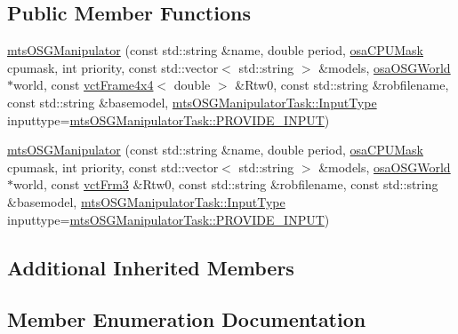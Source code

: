 \subsection*{Public Member Functions}
\begin{DoxyCompactItemize}
\item 
\hyperlink{classmts_o_s_g_manipulator_ad0e556ae33153cc2c06804894bce948a}{mts\+O\+S\+G\+Manipulator} (const std\+::string \&name, double period, \hyperlink{osa_c_p_u_affinity_8h_aaec7cdd7797e5e6eb5438c15fee5477a}{osa\+C\+P\+U\+Mask} cpumask, int priority, const std\+::vector$<$ std\+::string $>$ \&models, \hyperlink{classosa_o_s_g_world}{osa\+O\+S\+G\+World} $\ast$world, const \hyperlink{classvct_frame4x4}{vct\+Frame4x4}$<$ double $>$ \&Rtw0, const std\+::string \&robfilename, const std\+::string \&basemodel, \hyperlink{classmts_o_s_g_manipulator_task_a176aa50980ddf34d1150514bb620cb8f}{mts\+O\+S\+G\+Manipulator\+Task\+::\+Input\+Type} inputtype=\hyperlink{classmts_o_s_g_manipulator_task_a176aa50980ddf34d1150514bb620cb8fa73f760c3f4b883d0ce1a241d172e626a}{mts\+O\+S\+G\+Manipulator\+Task\+::\+P\+R\+O\+V\+I\+D\+E\+\_\+\+I\+N\+P\+U\+T})
\item 
\hyperlink{classmts_o_s_g_manipulator_a5d858b4f653797b6945b87be39da8830}{mts\+O\+S\+G\+Manipulator} (const std\+::string \&name, double period, \hyperlink{osa_c_p_u_affinity_8h_aaec7cdd7797e5e6eb5438c15fee5477a}{osa\+C\+P\+U\+Mask} cpumask, int priority, const std\+::vector$<$ std\+::string $>$ \&models, \hyperlink{classosa_o_s_g_world}{osa\+O\+S\+G\+World} $\ast$world, const \hyperlink{vct_transformation_types_8h_a81feda0a02c2d1bc26e5553f409fed20}{vct\+Frm3} \&Rtw0, const std\+::string \&robfilename, const std\+::string \&basemodel, \hyperlink{classmts_o_s_g_manipulator_task_a176aa50980ddf34d1150514bb620cb8f}{mts\+O\+S\+G\+Manipulator\+Task\+::\+Input\+Type} inputtype=\hyperlink{classmts_o_s_g_manipulator_task_a176aa50980ddf34d1150514bb620cb8fa73f760c3f4b883d0ce1a241d172e626a}{mts\+O\+S\+G\+Manipulator\+Task\+::\+P\+R\+O\+V\+I\+D\+E\+\_\+\+I\+N\+P\+U\+T})
\end{DoxyCompactItemize}
\subsection*{Additional Inherited Members}


\subsection{Member Enumeration Documentation}
\hypertarget{classmts_o_s_g_manipulator_ac2491ea5f0c735f009c5f8ff91a931b4}{}
